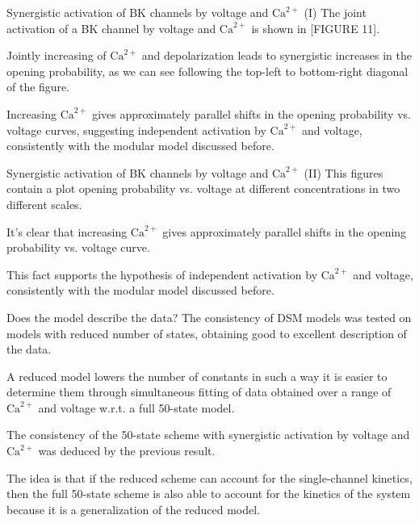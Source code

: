 \documentclass[t]{beamer}
\newcommand{\ca}{\text{Ca}^{2+}}
\begin{document}
\begin{frame}{Synergistic activation of BK channels by voltage and $\ca$ (I)}
The joint activation of a BK channel by voltage and $\ca$ is shown in [FIGURE 11].

Jointly increasing of $\ca$ and depolarization leads to synergistic increases in the opening probability, as we can see following the top-left to bottom-right diagonal of the figure.

Increasing $\ca$ gives approximately parallel shifts in the opening probability vs. voltage curves, suggesting independent activation by $\ca$ and voltage, consistently with the modular model discussed before.
\end{frame}

\begin{frame}{Synergistic activation of BK channels by voltage and $\ca$ (II)}
This figures contain a plot opening probability vs. voltage at different concentrations in two different scales.

It's clear that increasing $\ca$ gives approximately parallel shifts in the opening probability vs. voltage curve.

This fact supports the hypothesis of independent activation by $\ca$ and voltage, consistently with the modular model discussed before.
\end{frame}

\begin{frame}{Does the model describe the data?}
The consistency of DSM models was tested on models with reduced number of states, obtaining good to excellent description of the data.

A reduced model lowers the number of constants in such a way it is easier to determine them through simultaneous fitting of data obtained over a range of $\ca$ and voltage w.r.t. a full 50-state model.

The consistency of the 50-state scheme with synergistic activation by voltage and $\ca$ was deduced by the previous result.

The idea is that if the reduced scheme can account for the single-channel kinetics, then the full 50-state scheme is also able to account for the kinetics of the system because it is a generalization of the reduced model.


\end{frame}

\end{document}
